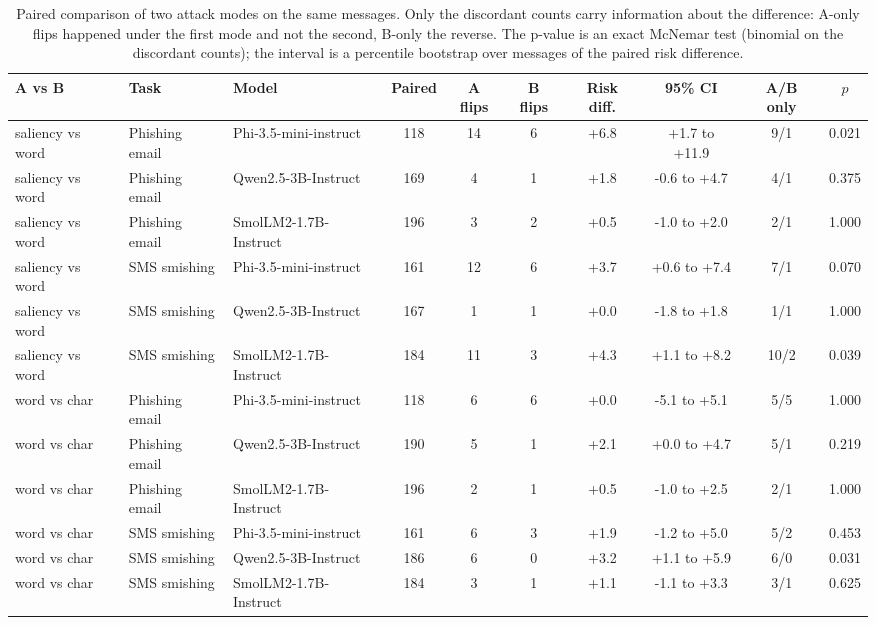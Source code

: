 \begin{table}[t]
\centering
\small
\caption{Paired comparison of two attack modes on the same messages. Only the discordant counts carry information about the difference: A-only flips happened under the first mode and not the second, B-only the reverse. The p-value is an exact McNemar test (binomial on the discordant counts); the interval is a percentile bootstrap over messages of the paired risk difference.}
\label{tab:pairs}
\begin{tabular}{lllccccccc}
\toprule
\textbf{A vs B} & \textbf{Task} & \textbf{Model} & \textbf{Paired} & \textbf{A flips} & \textbf{B flips} & \textbf{Risk diff.} & \textbf{95\% CI} & \textbf{A/B only} & \textbf{$p$} \\
\midrule
 saliency vs word & Phishing email & Phi-3.5-mini-instruct & 118 & 14 & 6 & +6.8 & +1.7 to +11.9 & 9/1 & 0.021 \\
 saliency vs word & Phishing email & Qwen2.5-3B-Instruct & 169 & 4 & 1 & +1.8 & -0.6 to +4.7 & 4/1 & 0.375 \\
 saliency vs word & Phishing email & SmolLM2-1.7B-Instruct & 196 & 3 & 2 & +0.5 & -1.0 to +2.0 & 2/1 & 1.000 \\
 saliency vs word & SMS smishing & Phi-3.5-mini-instruct & 161 & 12 & 6 & +3.7 & +0.6 to +7.4 & 7/1 & 0.070 \\
 saliency vs word & SMS smishing & Qwen2.5-3B-Instruct & 167 & 1 & 1 & +0.0 & -1.8 to +1.8 & 1/1 & 1.000 \\
 saliency vs word & SMS smishing & SmolLM2-1.7B-Instruct & 184 & 11 & 3 & +4.3 & +1.1 to +8.2 & 10/2 & 0.039 \\
 word vs char & Phishing email & Phi-3.5-mini-instruct & 118 & 6 & 6 & +0.0 & -5.1 to +5.1 & 5/5 & 1.000 \\
 word vs char & Phishing email & Qwen2.5-3B-Instruct & 190 & 5 & 1 & +2.1 & +0.0 to +4.7 & 5/1 & 0.219 \\
 word vs char & Phishing email & SmolLM2-1.7B-Instruct & 196 & 2 & 1 & +0.5 & -1.0 to +2.5 & 2/1 & 1.000 \\
 word vs char & SMS smishing & Phi-3.5-mini-instruct & 161 & 6 & 3 & +1.9 & -1.2 to +5.0 & 5/2 & 0.453 \\
 word vs char & SMS smishing & Qwen2.5-3B-Instruct & 186 & 6 & 0 & +3.2 & +1.1 to +5.9 & 6/0 & 0.031 \\
 word vs char & SMS smishing & SmolLM2-1.7B-Instruct & 184 & 3 & 1 & +1.1 & -1.1 to +3.3 & 3/1 & 0.625 \\
\bottomrule
\end{tabular}
\end{table}
